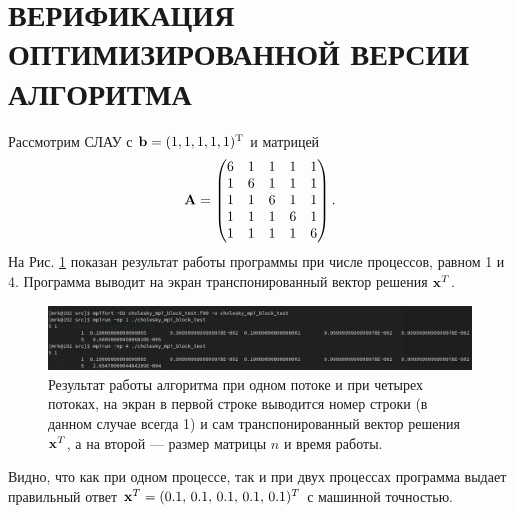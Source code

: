 \section{ВЕРИФИКАЦИЯ ОПТИМИЗИРОВАННОЙ ВЕРСИИ АЛГОРИТМА}

Рассмотрим СЛАУ с $\vb{b} = (1,1,1,1,1)^\mathrm{T}$ и матрицей
\begin{equation*}
    \vb{A} = 
    \begin{pmatrix}
        6&1&1&1&1 \\
        1&6&1&1&1 \\
        1&1&6&1&1 \\
        1&1&1&6&1 \\
        1&1&1&1&6 \\
    \end{pmatrix}.
\end{equation*}
На Рис. \ref{fig:screenshot} показан результат работы программы при числе процессов, равном 1 и 4. Программа выводит на экран транспонированный вектор решения $\vb{x}^T$.
\begin{figure}[htbp]
    \centering
    \includegraphics[width=\textwidth]{fig/screenshot.png}
    \caption{Результат работы алгоритма при одном потоке и при четырех потоках, на экран в первой строке выводится номер строки (в данном случае всегда 1) и сам транспонированный вектор решения $\vb{x}^T$, а на второй --- размер матрицы $n$ и время работы.}
    \label{fig:screenshot}
\end{figure}
Видно, что как при одном процессе, так и при двух процессах программа выдает правильный ответ $\vb{x}^T = (0.1,\,0.1,\,0.1,\,0.1,\,0.1)^T$ с машинной точностью.